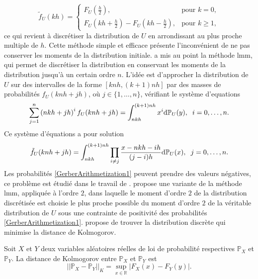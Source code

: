 \begin{equation}\label{RoundedMethod}
\tilde{f}_{U}(kh)=
\begin{cases} 
F_{U}\left(\frac{h}{2}\right), &\mbox{pour } k = 0, \\ 
F_{U}\left(kh+\frac{h}{2}\right) - F_{U}\left(kh-\frac{h}{2}\right),& \mbox{pour } k \geq 1, \end{cases}
\end{equation} 
ce qui revient à discrétiser la distribution de $U$ en arrondissant au plus proche multiple de $h$. Cette méthode simple et efficace présente l\rq{}inconvénient de ne pas conserver les moments de la distribution initiale. \citet{Ge82} a mis au point la méthode \gls{lmm}, qui permet de discrétiser la distribution en conservant les moments de la distribution jusqu\rq{}à un certain ordre $n$. L\rq{}idée est d\rq{}approcher la distribution de $U$ sur des intervalles de la forme $[knh,(k+1)nh]$ par des masses de probabilités $f_{U}(knh+jh)$, où $j\in\{1,\ldots,n\}$, vérifiant le système d\rq{}equations
\begin{equation}
\sum_{j=1}^{n}\left(nkh + jh\right)^{i}f_{U}(knh+jh)=\int_{nkh}^{(k+1)nh} x^{i}\text{d}\mathbb{P}_{U}(y),\hspace{0.2cm}i=0,\ldots,n.
\end{equation}
Ce système d\rq{}équations a pour solution 
\begin{equation}\label{GerberArithmetization1}
\tilde{f}_{U}(knh+jh)=\int_{nkh}^{(k+1)nh}\prod_{i\neq j}\frac{x-nkh-ih}{(j-i)h}\text{d}\mathbb{P}_{U}(x),\hspace{0.2cm}j=0,\ldots,n.
\end{equation} 
Les probabilités \eqref{GerberArithmetization1} peuvent prendre des valeurs négatives, ce problème est étudié dans le travail de \citet{CoDe07}. \citet{Vi00} propose une variante de la méthode \gls{lmm}, appliquée à l\rq{}ordre $2$, dans laquelle le moment d\rq{}ordre $2$ de la distribution discrétisée est choisie le plus proche possible du moment d\rq{}ordre $2$ de la véritable distribution de $U$ sous une contrainte de positivité des probabilités \eqref{GerberArithmetization1}. \citet{WaPa98} propose de trouver la distribution discrète qui minimise la distance de Kolmogorov.
\begin{Def}\label{KolmogorvDistanceDefinition}
Soit $X$ et $Y$ deux variables aléatoires réelles de loi de probabilité respectives $\mathbb{P}_{X}$ et $\mathbb{P}_{Y}$. La distance de Kolmogorov entre $\mathbb{P}_{X}$ et $\mathbb{P}_{Y}$ est
\begin{equation}\label{KolmogorovDistance}
||\mathbb{P}_{X} -\mathbb{P}_{Y}||_{K}=\sup_{x\in\mathbb{R}}\left|F_{X}(x)-F_{Y}(y)\right|.
\end{equation}
\end{Def}
